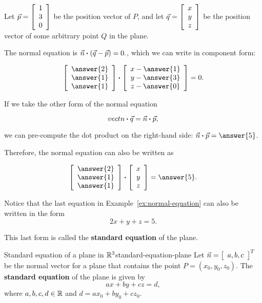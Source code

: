\documentclass{ximera}
\begin{document}
\begin{solution}
  Let $\vect{p}=\startmat{c}1\\3\\0\stopmat$ be the position vector of $P$, and let
  $\vect{q}=\startmat{c}x\\y\\z\stopmat$ be the position vector of some arbitrary
  point $Q$ in the plane. 
  
  The normal equation is
  $\vect{n} \dotprod (\vec{q}-\vect{p}) = 0.$, which we
  can write in component form:

  \begin{equation*}
    \startmat{c}\answer{2}\\\answer{1}\\\answer{1}\stopmat
    \dotprod
    \startmat{c}x-\answer{1}\\y-\answer{3}\\z-\answer{0}\stopmat
    =0.
  \end{equation*}

  If we take the other form of the normal equation 
  
  $$vect{n} \dotprod \vect{q} = \vect{n} \dotprod \vect{p},$$
  
  we can pre-compute the dot product on the right-hand side:
  $\vect{n} \dotprod \vect{p} = \answer{5}$. 
  
  Therefore, the
  normal equation can also be written as

  \begin{equation*}
    \startmat{c}\answer{2}\\\answer{1}\\\answer{1}\stopmat
    \dotprod
    \startmat{c}x\\y\\z\stopmat
    = \answer{5}.
  \end{equation*}
\end{solution}

Notice that the last equation in Example~\ref{ex:normal-equation} can
also be written in the form
\begin{equation*}
  2x + y + z = 5.
\end{equation*}

This last form is called the \textbf{standard equation} of the plane.

\begin{definition}{Standard equation of a plane in $\R^3$}{standard-equation-plane}
  Let $\vect{n} = \startmat{c}a,b,c\stopmat^T$ be the normal vector for a plane that
  contains the point $P = (x_0, y_0, z_0)$. The \textbf{standard
    equation}%
   of the plane is given by
  \begin{equation*}
    ax + by + cz = d,
  \end{equation*}
  where $a,b,c,d \in \R$ and $d = ax_0 + by_0 + cz_0$.
\end{definition}
\end{document}
